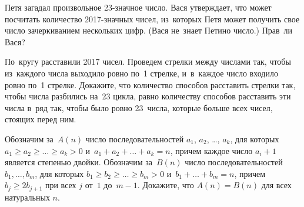 


\begin{problems}

\item
Петя загадал произвольное 23-значное число.
Вася утверждает, что может посчитать количество 2017-значных чисел, из~которых 
Петя может получить свое число зачеркиванием нескольких цифр.
(Вася не~знает Петино число.)
Прав~ли Вася?

\item
По~кругу расставили 2017 чисел.
Проведем стрелки между числами так, чтобы из~каждого числа выходило ровно
по~1 стрелке, и~в~каждое число входило ровно по~1 стрелке.
Докажите, что количество способов расставить стрелки так, чтобы числа разбились
на~23 цикла, равно количеству способов расставить эти числа в~ряд так, чтобы
было ровно 23~числа, которые больше всех чисел, стоящих перед ним.

\item
Обозначим за~$A(n)$ число последовательностей $a_{1}$, $a_{2}$, \ldots,
$a_{k}$, для которых
\(
    a_{1} \geq a_{2} \geq \ldots \geq a_{k} > 0
\) и~\(
    a_{1} + a_{2} + \ldots + a_{k} = n
\), причем каждое число $a_{i} + 1$ является степенью двойки.
Обозначим за~$B(n)$ число последовательностей $b_{1}, \ldots, b_{m}$, для которых
\(
    b_{1} \geq b_{2} \geq \ldots \geq b_{m} > 0
\) и~\(
    b_{1} + \ldots + b_{m} = n
\), причем $b_{j} \geq 2 b_{j+1}$ при всех $j$ от~$1$ до~$m - 1$.
Докажите, что $A(n) = B(n)$ для всех натуральных $n$.

\end{problems}

